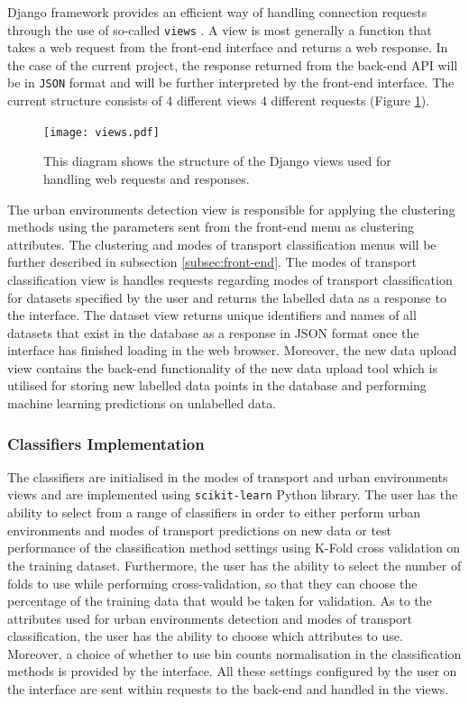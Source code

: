 \documentclass[bsc,frontabs,twoside,singlespacing, parskip,deptreport]{infthesis}     %
\begin{document}
Django framework provides an efficient way of handling connection requests through the use of so-called \texttt{views} \cite{django-views}. A view is most generally a function that takes a web request from the front-end interface and returns a web response. In the case of the current project, the response returned from the back-end API will be in \texttt{JSON} format \cite{json} and will be further interpreted by the front-end interface. The current structure consists of 4 different views 4 different requests (Figure \ref{fig:views}).

\begin{figure}[h!]
  \center
  \texttt{[image: views.pdf]}
  \caption{This diagram shows the structure of the Django views used for handling web requests and responses.}
  \label{fig:views}
\end{figure}

The urban environments detection view is responsible for applying the clustering methods using the parameters sent from the front-end menu as clustering attributes. The clustering and modes of transport classification menus will be further described in subsection \ref{subsec:front-end}. The modes of transport classification view is handles requests regarding modes of transport classification for datasets specified by the user and returns the labelled data as a response to the interface. The dataset view returns unique identifiers and names of all datasets that exist in the database as a response in JSON format once the interface has finished loading in the web browser. Moreover, the new data upload view contains the back-end functionality of the new data upload tool which is utilised for storing new labelled data points in the database and performing machine learning predictions on unlabelled data.


\subsubsection*{Classifiers Implementation}

The classifiers are initialised in the modes of transport and urban environments views and are implemented using \texttt{scikit-learn} \cite{scikit-learn} Python library. The user has the ability to select from a range of classifiers in order to either perform urban environments and modes of transport predictions on new data or test performance of the classification method settings using K-Fold cross validation on the training dataset. Furthermore, the user has the ability to select the number of folds to use while performing cross-validation, so that they can choose the percentage of the training data that would be taken for validation. As to the attributes used for urban environments detection and modes of transport classification, the user has the ability to choose which attributes to use. Moreover, a choice of whether to use bin counts normalisation in the classification methods is provided by the interface. All these settings configured by the user on the interface are sent within requests to the back-end and handled in the views.
\end{document}
